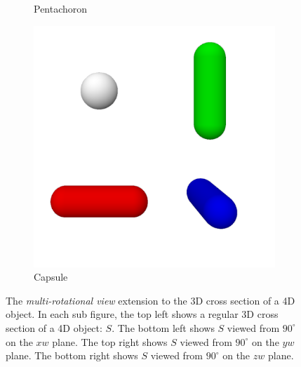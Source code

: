 \documentclass{l4proj}
\begin{document}
\begin{figure}[H]
\begin{subfigure}[b]{0.33\textwidth}
    \caption{Pentachoron}
    \label{fig:rep_multi-pentachoron}
  \end{subfigure}
  \begin{subfigure}[b]{0.33\textwidth}
    \includegraphics[width=\textwidth]{images/representations/multi-capsule.png}
    \caption{Capsule}
    \label{fig:rep_multi-capsule}
  \end{subfigure}
  \caption{
    The \emph{multi-rotational view} extension to the 3D cross section of a 4D object. In each sub figure, the top left shows a regular 3D cross section of a 4D object: $S$. The bottom left shows $S$ viewed from $90^{\circ}$ on the $xw$ plane. The top right shows $S$ viewed from $90^{\circ}$ on the $yw$ plane. The bottom right shows $S$ viewed from $90^{\circ}$ on the $zw$ plane.
    }
  \label{fig:rep_multi}
\end{figure}
%
\end{document}
